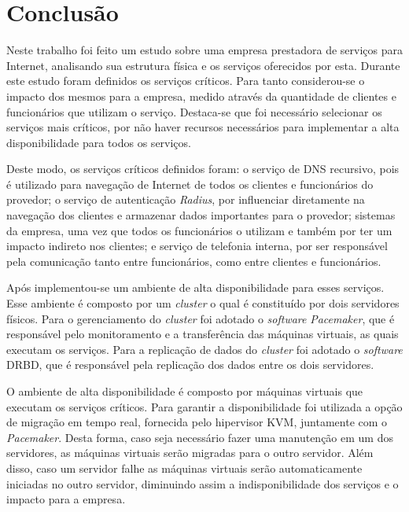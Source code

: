 \chapter{Conclusão}
\label{cap:conclusao}

Neste trabalho foi feito um estudo sobre uma empresa prestadora de serviços para Internet, analisando sua estrutura física e os serviços oferecidos 
por esta. Durante este estudo foram definidos os serviços críticos. Para tanto considerou-se o impacto dos mesmos para a empresa, medido através
da quantidade de clientes e funcionários que utilizam o serviço. Destaca-se que foi necessário selecionar os serviços mais críticos, por não 
haver recursos necessários para implementar a alta disponibilidade para todos os serviços.

Deste modo, os serviços críticos definidos foram: o serviço de \ac{DNS} recursivo, pois é utilizado para navegação de Internet de todos os clientes 
e funcionários do provedor; o serviço de autenticação \textit{Radius}, por influenciar diretamente na navegação dos clientes e armazenar dados 
importantes para o provedor; sistemas da empresa, uma vez que todos os funcionários o utilizam e também por ter um impacto indireto nos 
clientes; e serviço de telefonia interna, por ser responsável pela comunicação tanto entre funcionários, como entre clientes e funcionários.

Após implementou-se um ambiente de alta disponibilidade para esses serviços. Esse ambiente é composto por um \textit{cluster} o qual é constituído 
por dois servidores físicos. Para o gerenciamento do \textit{cluster} foi adotado o \textit{software} \textit{Pacemaker}, que é responsável pelo 
monitoramento e a transferência das máquinas virtuais, as quais executam os serviços. Para a replicação de dados 
do \textit{cluster} foi adotado o \textit{software} \ac{DRBD}, que é responsável pela replicação dos dados entre os dois servidores.

O ambiente de alta disponibilidade é composto por máquinas virtuais que executam os serviços críticos. Para garantir a disponibilidade 
foi utilizada a opção de migração em tempo real, fornecida pelo hipervisor \ac{KVM}, juntamente com o \textit{Pacemaker}. Desta forma, 
caso seja necessário fazer uma manutenção em um dos servidores, as máquinas virtuais serão migradas para o outro servidor.
Além disso, caso um servidor falhe as máquinas virtuais serão automaticamente iniciadas no outro servidor, diminuindo assim a indisponibilidade
dos serviços e o impacto para a empresa.

